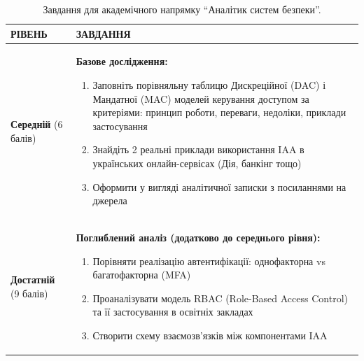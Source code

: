
\begin{table}[h!]
\caption{Завдання для академічного напрямку ``Аналітик систем безпеки''.}
\label{tab:lesson4_acad_task} %
\noindent %


\begin{tabular}{
  | >{\raggedright\arraybackslash}p{} 
  | >{\raggedright\arraybackslash}p{} |
}
\hline

\rowcolor{TableHeaderBlue}
\hfil \color{white}\textbf{РІВЕНЬ} & 
\hfil \color{white}\textbf{ЗАВДАННЯ} \\ \hline

\textbf{Середній} (6 балів) &
\textbf{Базове дослідження:}
\begin{enumerate}
    \item Заповніть порівняльну таблицю Дискреційної (DAC) і Мандатної (MAC) моделей керування доступом за критеріями: принцип роботи, переваги, недоліки, приклади застосування
    \item Знайдіть 2 реальні приклади використання IAA в українських онлайн-сервісах (Дія, банкінг тощо)
    \item Оформити у вигляді аналітичної записки з посиланнями на джерела
\end{enumerate} \\ \hline

\textbf{Достатній} (9 балів)&
\textbf{Поглиблений аналіз (додатково до середнього рівня):}
\begin{enumerate}
    \item Порівняти реалізацію автентифікації: однофакторна vs багатофакторна (MFA)
    \item Проаналізувати модель RBAC (Role-Based Access Control) та її застосування в освітніх закладах
    \item Створити схему взаємозв'язків між компонентами IAA
\end{enumerate} \\ \hline


\end{tabular}
\end{table}
